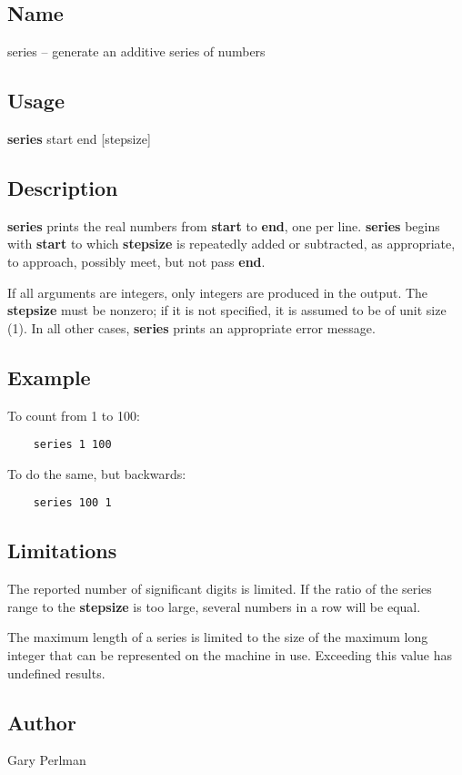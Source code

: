 
\subsection*{Name}
series -- generate an additive series of numbers

\subsection*{Usage}

{\bf series} start end [stepsize]

\subsection*{Description}

{\bf series} prints the real numbers from
{\bf start} to {\bf end}, one per line.
{\bf series} begins with {\bf start} 
to which {\bf stepsize} is repeatedly added or subtracted,
as appropriate, to approach, possibly meet, but not pass
{\bf end}.

If all arguments are integers, only integers are 
produced in the output.
The {\bf stepsize} must be nonzero; if it is not specified,
it is assumed to be of unit size (1).
In all other cases,
{\bf series} prints an appropriate error message.

\subsection*{Example}
To count from 1 to 100:
\begin{verbatim}
	series 1 100 
\end{verbatim}
To do the same, but backwards:
\begin{verbatim}
	series 100 1
\end{verbatim}

\subsection*{Limitations}

The reported number of significant digits is limited.
If the ratio of the series range to the
{\bf stepsize} is too large, several numbers in a row will be equal. 

The maximum length of a series is limited to the size of the
maximum long integer that can be represented on the machine in use.
Exceeding this value has undefined results.

\subsection*{Author}

Gary Perlman
